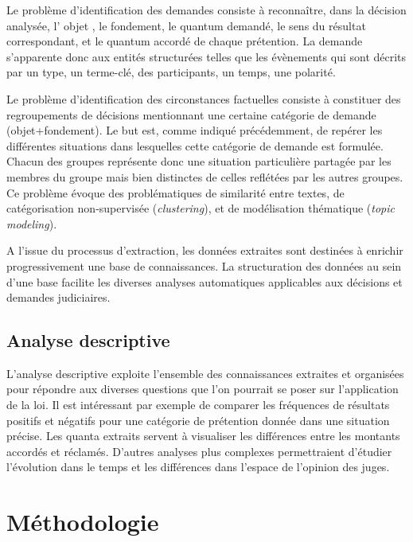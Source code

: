Le problème d'identification des demandes consiste à reconnaître, dans la décision analysée, l' objet , le fondement, le quantum demandé, le sens du résultat correspondant, et le quantum accordé de chaque prétention. La demande s'apparente donc aux entités structurées telles que les évènements \cite{ace2005event} qui sont décrits par un type, un terme-clé, des participants, un temps, une polarité.

Le problème d'identification des circonstances factuelles consiste à constituer des regroupements de décisions mentionnant une certaine catégorie de demande (objet+fondement). Le but est, comme indiqué précédemment, de repérer les différentes situations dans lesquelles cette catégorie de demande est formulée. Chacun des groupes représente donc une situation particulière partagée par les membres du groupe mais bien distinctes de celles reflétées par les autres groupes. Ce problème évoque des problématiques de similarité entre textes, de catégorisation non-supervisée (\textit{clustering}), et de \og modélisation thématique \fg{} (\textit{topic modeling}). 

A l'issue du processus d'extraction, les données extraites sont destinées à enrichir progressivement une base de connaissances. La structuration des données au sein d'une base facilite les diverses analyses automatiques applicables aux décisions et demandes judiciaires. 

\subsection{Analyse descriptive}
L'analyse descriptive exploite l'ensemble des connaissances extraites et organisées pour répondre aux diverses questions que l'on pourrait se poser sur l'application de la loi. Il est intéressant par exemple de comparer les fréquences de résultats positifs et négatifs pour une catégorie de prétention donnée dans une situation précise. Les quanta extraits servent à visualiser les différences entre les montants accordés et réclamés. D'autres analyses plus complexes permettraient d'étudier l'évolution dans le temps et les différences dans l'espace de l'opinion des juges.


\section{Méthodologie}
\label{sec:intro:methodologie}

